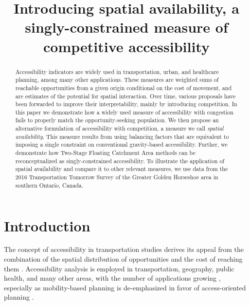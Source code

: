 \documentclass[]{elsarticle} %
\begin{document}
\begin{frontmatter}

  \title{Introducing spatial availability, a singly-constrained measure
of competitive accessibility}
  
  \begin{abstract}
  Accessibility indicators are widely used in transportation, urban, and
  healthcare planning, among many other applications. These measures are
  weighted sums of reachable opportunities from a given origin
  conditional on the cost of movement, and are estimates of the
  potential for spatial interaction. Over time, various proposals have
  been forwarded to improve their interpretability, mainly by
  introducing competition. In this paper we demonstrate how a widely
  used measure of accessibility with congestion fails to properly match
  the opportunity-seeking population. We then propose an alternative
  formulation of accessibility with competition, a measure we call
  \emph{spatial availability}. This measure results from using balancing
  factors that are equivalent to imposing a single constraint on
  conventional gravity-based accessibility. Further, we demonstrate how
  Two-Stage Floating Catchment Area methods can be reconceptualized as
  singly-constrained accessibility. To illustrate the application of
  spatial availability and compare it to other relevant measures, we use
  data from the 2016 Transportation Tomorrow Survey of the Greater
  Golden Horseshoe area in southern Ontario, Canada.
  \end{abstract}
  
 \end{frontmatter}

\newpage

\hypertarget{sec:introduction}{%
\section{Introduction}\label{sec:introduction}}

The concept of accessibility in transportation studies derives its
appeal from the combination of the spatial distribution of opportunities
and the cost of reaching them \citep{hansen1959, handy_measuring_1997}.
Accessibility analysis is employed in transportation, geography, public
health, and many other areas, with the number of applications growing
\citep{shi_literature_2020}, especially as mobility-based planning is
de-emphasized in favor of access-oriented planning
\citep{deboosere2018, handy2020, proffitt2017, yan2021}.
\end{document}

